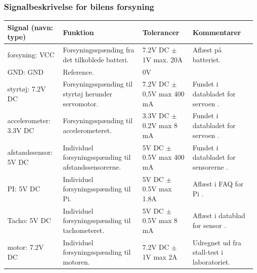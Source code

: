 \clearpage

\subsubsection{Signalbeskrivelse for bilens forsyning}

\begin{table}[h]
	\centering
	\begin{tabularx}{\textwidth}{|l|Z|Z|Z|} \hline
	\textbf{Signal (navn: type)} & \textbf{Funktion} & \textbf{Tolerancer} & \textbf{Kommentarer} \\ \hline
forsyning: VCC
	& Forsyningsspænding fra det tilkoblede batteri. 
	& 7.2V DC $\pm$ 1V max. 20A
 	& Aflæst på batteriet.
	\\ \hline
	
GND: GND
	& Reference. 
	& 0V
 	& ~
	\\ \hline
	
styrtøj: 7.2V DC
	& Forsyningsspænding til styrtøj herunder servomotor. 
	& 7.2V DC $\pm$ 0,5V max 400 mA
 	& Fundet i databladet for servoen \cite{lib:servo}.
	\\ \hline
	
accelerometer: 3.3V DC
	& Forsyningsspænding til accelerometeret.
	& 3.3V DC $\pm$ 0.2V max 8 mA
 	& Fundet i databladet for servoen \cite{lib:accel}.
	\\ \hline
	
afstandssensor: 5V DC
	& Individuel forsyningsspænding til afstandssensorerne.
	& 5V DC $\pm$ 0.5V max 400 mA
 	& Fundet i databladet for sensorerne \cite{lib:maxsonar}.
	\\ \hline
	
PI: 5V DC
	& Individuel forsyningsspænding til Pi.
	& 5V DC $\pm$ 0.5V max 1.8A
 	& Aflæst i FAQ for Pi \cite{lib:PI2PSU}.
	\\ \hline
	
Tacho: 5V DC
	& Individuel forsyningsspænding til tachometeret.
	& 5V DC $\pm$ 0.5V max 8 mA
 	& Aflæst i datablad for sensor \cite{lib:tacho}.
	\\ \hline
	
motor: 7.2V DC
	& Individuel forsyningsspænding til motoren.
	& 7.2V DC $\pm$ 1V max 2A

 	& Udregnet ud fra stall-test i laboratoriet.
	\\ \hline
	\end{tabularx}
	\label{tbl:bil_forsyninger}
\end{table}
\clearpage

\clearpage

\clearpage

\clearpage

\clearpage

